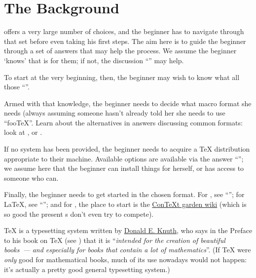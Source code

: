 
\section{The Background}


\alltex{} offers a very large number of choices, and the beginner has
to navigate through that set before even taking his first steps.  The
aim here is to guide the beginner through a set of answers that may
help the process.  We assume the beginner `knows' that \alltex{} is
for them; if not, the discussion ``''
may help.

To start at the very beginning, then, the beginner may wish to know
what all those %
``''.

Armed with that knowledge, the beginner needs to decide what macro
format she needs (always assuming someone hasn't already told her she
needs to use ``foo\TeX{}''.  Learn about the alternatives in answers
discussing common formats: look at %
,
 or
.

If no system has been provided, the beginner needs to acquire a \TeX{}
distribution appropriate to their machine.  Available options are
available via the answer %
``''; we assume
here that the beginner can install things for herself, or has access
to someone who can.

Finally, the beginner needs to get started in the chosen format.  For
\plaintex{}, see ``'';
for \LaTeX{}, see %
``''; and for
\context{}, the place to start is the %
\href{http://wiki.contextgarden.net/Main_Page}{ConTeXt garden wiki}
(which is so good the present s don't even try to compete).



\TeX{} is a typesetting system written by
\href{http://sunburn.stanford.edu/~knuth/}{Donald E. Knuth}, who
says in the Preface to his book on \TeX{}
(see ) that it is
``\emph{intended for the creation of beautiful books~---}
\emph{and especially for books that contain a lot of mathematics}''.
(If \TeX{} were \emph{only} good for mathematical books, much of its
use nowadays would not happen: it's actually a pretty good general
typesetting system.)


